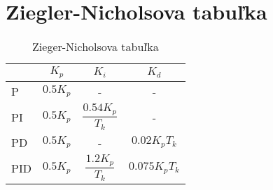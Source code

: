 \chapter{Ziegler-Nicholsova tabuľka}

\bgroup
\def\arraystretch{1.8}
\begin{table}[h]
\centering
\begin{tabular}{|m{1.7cm}|c|c|c|}
\hline
 & \textbf{$K_p$} & \textbf{$K_i$} & \textbf{$K_d$}\\
\hline
P & $0.5K_p$ & - & - \\
PI & $0.5K_p$ & $\dfrac{0.54K_p}{T_k}$ & - \\
PD & $0.5K_p$ & - & $0.02K_pT_k$ \\
PID & $0.5K_p$ & $\dfrac{1.2K_p}{T_k}$ & $0.075K_pT_k$ \\
\hline
\end{tabular}
\caption{Zieger-Nicholsova tabuľka}
\label{tab:Ziegler-Nichols}
\end{table}
\egroup
